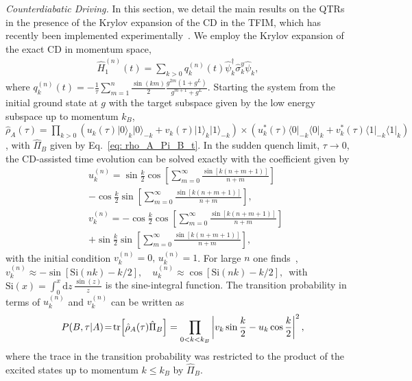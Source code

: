 \documentclass[prl,aps,amssymb,twocolumn,superscriptaddress, notitlepage, longbibliography]{revtex4-2}
\begin{document}
{\it Counterdiabatic Driving.}
In this section, we detail the main results on the QTRs in the presence of the Krylov expansion of the CD in the TFIM, which has recently been implemented experimentally~\cite {Visuri_2025}.
We employ the Krylov expansion of the exact CD in momentum space,
\begin{eqnarray}
    \hat H^{(n)}_1(t)=\sum_{k>0}q^{(n)}_k(t) \hat{\psi}^\dagger_k\hat\sigma^y_k\hat{\psi}_k,
\end{eqnarray}
where $q^{(n)}_k(t)=-\frac{1}{\tau}\sum_{m=1}^n\frac{\sin(km)}{2}\frac{g^{2m}(1+g^L)}{g^{m+1}+g^L}$. Starting the system from the initial ground state at $g$ with the target subspace given by the low energy subspace up to momentum $k_B$,
$\hat\rho_A(\tau)=\prod_{k>0} \left(u_k(\tau)\lvert 0\rangle_{k}\lvert 0\rangle_{-k}+v_k(\tau)\lvert 1\rangle_{k}\lvert 1\rangle_{-k}\right)
\times\left(u^*_k(\tau)\langle 0\rvert_{-k}\langle 0\rvert_{k}+v^*_k(\tau)\langle 1\rvert_{-k}\langle 1\rvert_{k}\right)$,
with $\hat\Pi_B$ given by Eq.~\eqref{eq: rho_A_Pi_B_t}.
In the sudden quench limit, $\tau\rightarrow 0$, the CD-assisted time evolution can be solved exactly with the coefficient given by
\begin{eqnarray}
    &&u^{(n)}_k=\sin\frac{k}{2}\cos\left[\sum_{m=0}^\infty\frac{\sin[k(n+m+1)]}{n+m}\right]\nonumber\\
    &&-\cos\frac{k}{2}\sin\left[\sum_{m=0}^\infty\frac{\sin[k(n+m+1)]}{n+m}\right],\\
    &&v^{(n)}_k=-\cos\frac{k}{2}\cos\left[\sum_{m=0}^\infty\frac{\sin[k(n+m+1)]}{n+m}\right]\nonumber\\
    &&+\sin\frac{k}{2}\sin\left[\sum_{m=0}^\infty\frac{\sin[k(n+m+1)]}{n+m}\right],
\end{eqnarray}
with the initial condition $v^{(n)}_k=0,\,u^{(n)}_k=1$.
For large $n$ one finds~\cite{grabarits2025UniversalCD},
    $v^{(n)}_k\approx-\sin\left[\mathrm{Si}(nk)-k/2\right],\quad u^{(n)}_k\approx\cos\left[\mathrm{Si}(nk)-k/2\right],\,$
with $\mathrm{Si}(x)=\int_0^x\mathrm dz\,\frac{\sin(z)}{z}$ is the sine-integral function.
The transition probability in terms of $u^{(n)}_k$ and $v^{(n)}_k$ can be written as
\begin{eqnarray}\label{eq: rho_A(t)}
    &&P(B,\tau\vert A)\!=\!\tr[\hat\rho_A(\tau)\hat\Pi_B]=\prod_{0<k<k_B} \left\lvert v_k\sin \frac{k}{2}-u_k\cos \frac{k}{2} \right\rvert^2,\nonumber\\
\end{eqnarray}
where the trace in the transition probability was restricted to the product of the excited states up to momentum $k\leq k_B$ by $\hat\Pi_B$.
\end{document}
